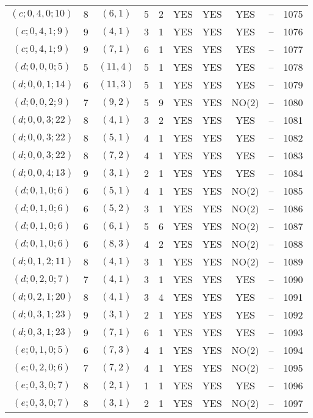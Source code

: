 \begin{longtable}{|c|c|c|c|c|c|c|c|c|c|}
$(c; 0, 4, 0; 10)$ & 8 & $(6, 1)$ & 5 & 2 & YES & YES & YES & -- & 1075\\
$(c; 0, 4, 1; 9)$ & 9 & $(4, 1)$ & 3 & 1 & YES & YES & YES & -- & 1076\\
$(c; 0, 4, 1; 9)$ & 9 & $(7, 1)$ & 6 & 1 & YES & YES & YES & -- & 1077\\
$(d; 0, 0, 0; 5)$ & 5 & $(11, 4)$ & 5 & 1 & YES & YES & YES & -- & 1078\\
$(d; 0, 0, 1; 14)$ & 6 & $(11, 3)$ & 5 & 1 & YES & YES & YES & -- & 1079\\
$(d; 0, 0, 2; 9)$ & 7 & $(9, 2)$ & 5 & 9 & YES & YES & NO(2) & -- & 1080\\
$(d; 0, 0, 3; 22)$ & 8 & $(4, 1)$ & 3 & 2 & YES & YES & YES & -- & 1081\\
$(d; 0, 0, 3; 22)$ & 8 & $(5, 1)$ & 4 & 1 & YES & YES & YES & -- & 1082\\
$(d; 0, 0, 3; 22)$ & 8 & $(7, 2)$ & 4 & 1 & YES & YES & YES & -- & 1083\\
$(d; 0, 0, 4; 13)$ & 9 & $(3, 1)$ & 2 & 1 & YES & YES & YES & -- & 1084\\
$(d; 0, 1, 0; 6)$ & 6 & $(5, 1)$ & 4 & 1 & YES & YES & NO(2) & -- & 1085\\
$(d; 0, 1, 0; 6)$ & 6 & $(5, 2)$ & 3 & 1 & YES & YES & NO(2) & -- & 1086\\
$(d; 0, 1, 0; 6)$ & 6 & $(6, 1)$ & 5 & 6 & YES & YES & NO(2) & -- & 1087\\
$(d; 0, 1, 0; 6)$ & 6 & $(8, 3)$ & 4 & 2 & YES & YES & NO(2) & -- & 1088\\
$(d; 0, 1, 2; 11)$ & 8 & $(4, 1)$ & 3 & 1 & YES & YES & NO(2) & -- & 1089\\
$(d; 0, 2, 0; 7)$ & 7 & $(4, 1)$ & 3 & 1 & YES & YES & YES & -- & 1090\\
$(d; 0, 2, 1; 20)$ & 8 & $(4, 1)$ & 3 & 4 & YES & YES & YES & -- & 1091\\
$(d; 0, 3, 1; 23)$ & 9 & $(3, 1)$ & 2 & 1 & YES & YES & YES & -- & 1092\\
$(d; 0, 3, 1; 23)$ & 9 & $(7, 1)$ & 6 & 1 & YES & YES & YES & -- & 1093\\
$(e; 0, 1, 0; 5)$ & 6 & $(7, 3)$ & 4 & 1 & YES & YES & NO(2) & -- & 1094\\
$(e; 0, 2, 0; 6)$ & 7 & $(7, 2)$ & 4 & 1 & YES & YES & NO(2) & -- & 1095\\
$(e; 0, 3, 0; 7)$ & 8 & $(2, 1)$ & 1 & 1 & YES & YES & YES & -- & 1096\\
$(e; 0, 3, 0; 7)$ & 8 & $(3, 1)$ & 2 & 1 & YES & YES & NO(2) & -- & 1097\\

\end{longtable}
